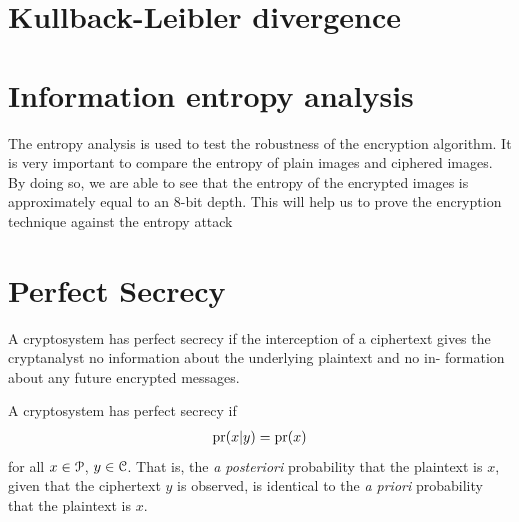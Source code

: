 \documentclass[a4paper, 12pt]{book} %
\begin{document}
\section{Kullback-Leibler divergence}



\section{Information entropy analysis}
The entropy analysis is used to test the robustness of the encryption algorithm. It is very important to compare the entropy of plain images and ciphered images. By doing so, we are able to see that the entropy of the encrypted images is approximately equal to an 8-bit depth. This will help us to prove the encryption technique against the entropy attack

\section{Perfect Secrecy}
A cryptosystem has perfect secrecy if the interception of a ciphertext gives
the cryptanalyst no information about the underlying plaintext and no in-
formation about any future encrypted messages.



\begin{definition}
    A cryptosystem has perfect secrecy if 
    \begin{align}
        \operatorname{pr}(x|y) = \operatorname{pr}(x)
    \end{align}
    for all $x \in \EuScript{P}$, $y \in \EuScript{C}$. That is, the \emph{a posteriori} probability that the plaintext is $x$, given that the ciphertext $y$ is observed, is identical to the \emph{a priori} probability that the plaintext is $x$.
\end{definition}









\end{document}
